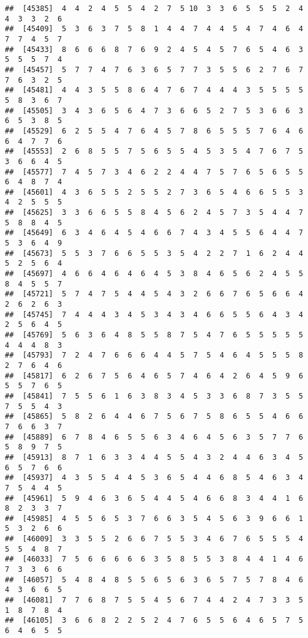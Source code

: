 \documentclass[
]{book}
\begin{document}
\begin{verbatim}
##  [45385]  4  4  2  4  5  5  4  2  7  5 10  3  3  6  5  5  5  2  4  4  3  3  2  6
##  [45409]  5  3  6  3  7  5  8  1  4  4  7  4  4  5  4  7  4  6  4  7  7  4  5  7
##  [45433]  8  6  6  6  8  7  6  9  2  4  5  4  5  7  6  5  4  6  3  5  5  5  7  4
##  [45457]  5  7  7  4  7  6  3  6  5  7  7  3  5  5  6  2  7  6  7  7  6  3  2  5
##  [45481]  4  4  3  5  5  8  6  4  7  6  7  4  4  4  3  5  5  5  5  5  8  3  6  7
##  [45505]  3  4  3  6  5  6  4  7  3  6  6  5  2  7  5  3  6  6  3  6  5  3  8  5
##  [45529]  6  2  5  5  4  7  6  4  5  7  8  6  5  5  5  7  6  4  6  6  4  7  7  6
##  [45553]  2  6  8  5  5  7  5  6  5  5  4  5  3  5  4  7  6  7  5  3  6  6  4  5
##  [45577]  7  4  5  7  3  4  6  2  2  4  4  7  5  7  6  5  6  5  5  6  4  8  7  4
##  [45601]  4  3  6  5  5  2  5  5  2  7  3  6  5  4  6  6  5  5  3  4  2  5  5  5
##  [45625]  3  3  6  6  5  5  8  4  5  6  2  4  5  7  3  5  4  4  7  5  8  8  4  5
##  [45649]  6  3  4  6  4  5  4  6  6  7  4  3  4  5  5  6  4  4  7  5  3  6  4  9
##  [45673]  5  5  3  7  6  6  5  5  3  5  4  2  2  7  1  6  2  4  4  5  2  5  6  4
##  [45697]  4  6  6  4  6  4  6  4  5  3  8  4  6  5  6  2  4  5  5  8  4  5  5  7
##  [45721]  5  7  4  7  5  4  4  5  4  3  2  6  6  7  6  5  6  6  4  2  6  2  6  3
##  [45745]  7  4  4  4  3  4  5  3  4  3  4  6  6  5  5  6  4  3  4  2  5  6  4  5
##  [45769]  5  6  3  6  4  8  5  5  8  7  5  4  7  6  5  5  5  5  5  4  4  4  8  3
##  [45793]  7  2  4  7  6  6  6  4  4  5  7  5  4  6  4  5  5  5  8  2  7  6  4  6
##  [45817]  6  2  6  7  5  6  4  6  5  7  4  6  4  2  6  4  5  9  6  5  5  7  6  5
##  [45841]  7  5  5  6  1  6  3  8  3  4  5  3  3  6  8  7  3  5  5  7  5  5  4  3
##  [45865]  5  8  2  6  4  4  6  7  5  6  7  5  8  6  5  5  4  6  6  7  6  6  3  7
##  [45889]  6  7  8  4  6  5  5  6  3  4  6  4  5  6  3  5  7  7  6  5  8  9  7  5
##  [45913]  8  7  1  6  3  3  4  4  5  5  4  3  2  4  4  6  3  4  5  6  5  7  6  6
##  [45937]  4  3  5  5  4  4  5  3  6  5  4  4  6  8  5  4  6  3  4  7  5  4  4  5
##  [45961]  5  9  4  6  3  6  5  4  4  5  4  6  6  8  3  4  4  1  6  8  2  3  3  7
##  [45985]  4  5  5  6  5  3  7  6  6  3  5  4  5  6  3  9  6  6  1  5  3  2  6  6
##  [46009]  3  3  5  5  2  6  6  7  5  5  3  4  6  7  6  5  5  5  4  5  5  4  8  7
##  [46033]  7  5  6  6  6  6  6  3  5  8  5  5  3  8  4  4  1  4  6  7  3  3  6  6
##  [46057]  5  4  8  4  8  5  5  6  5  6  3  6  5  7  5  7  8  4  6  4  3  6  6  5
##  [46081]  7  7  6  8  7  5  5  4  5  6  7  4  4  2  4  7  3  3  5  1  8  7  8  4
##  [46105]  3  6  6  8  2  2  5  2  4  7  6  5  5  6  4  6  5  7  5  6  4  6  5  5

\end{verbatim}
\end{document}

